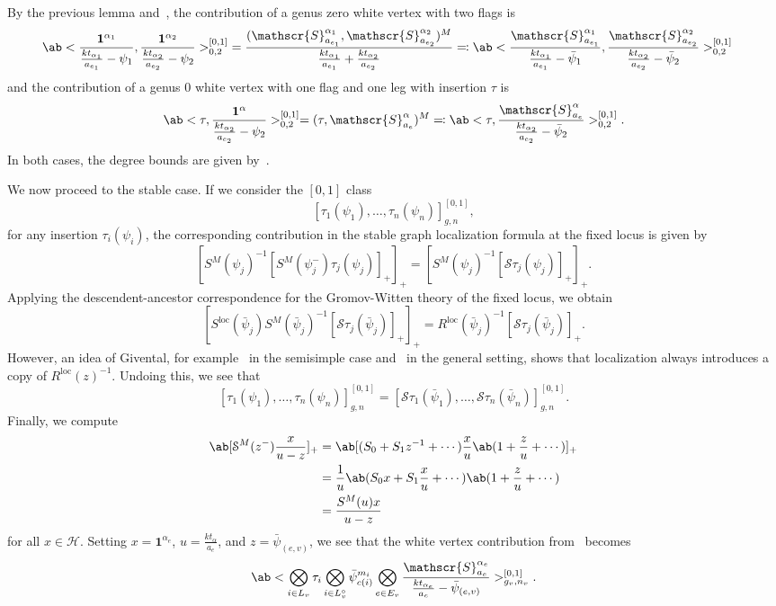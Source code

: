 \documentclass[10pt]{amsart}
\theoremstyle{definition}
\theoremstyle{remark}
\theoremstyle{plain}
\theoremstyle{definition}
\theoremstyle{remark}
\newcommand{\mc}[1]{\mathcal{#1}}
\newcommand{\msc}[1]{\mathscr{#1}}
\newcommand{\mr}[1]{\mathrm{#1}}
\newcommand{\1}{\mathbf{1}}
\newcommand{\2}{\mathbf{2}}
\newcommand{\3}{\mathbf{3}}
\newcommand{\loc}{\mr{loc}}
\numberwithin{equation}{section}
\begin{document}
By the previous lemma and~, the contribution of a genus zero white vertex with two flags is
\begin{align*}
    \ab<\frac{\1^{\alpha_1}}{\frac{k t_{\alpha_1}}{a_{e_1}} - \psi_1}, \frac{\1^{\alpha_2}}{\frac{kt_{\alpha_2}}{a_{e_2}} - \psi_2}>_{0,2}^{[0,1]} &= \frac{(\msc{S}_{a_{e_1}}^{\alpha_1}, \msc{S}_{a_{e_2}}^{\alpha_2})^M}{\frac{kt_{\alpha_1}}{a_{e_1}} + \frac{kt_{\alpha_2}}{a_{e_2}}} \eqqcolon \ab<\frac{\msc{S}_{a_{e_1}}^{\alpha_1}}{\frac{k t_{\alpha_1}}{a_{e_1}} - \bar{\psi}_1}, \frac{\msc{S}_{a_{e_2}}^{\alpha_2}}{\frac{kt_{\alpha_2}}{a_{e_2}} - \bar{\psi}_2}>_{0,2}^{[0,1]}
\end{align*}
and the contribution of a genus $0$ white vertex with one flag and one leg with insertion $\tau$ is
\begin{align*}
    \ab<\tau, \frac{\1^{\alpha}}{\frac{kt_{\alpha_2}}{a_{e_2}} - \psi_2}>_{0,2}^{[0,1]} = (\tau, \msc{S}_{a_e}^{\alpha})^M \eqqcolon\ab<\tau, \frac{\msc{S}_{a_e}^{\alpha}}{\frac{kt_{\alpha_2}}{a_{e_2}} - \bar{\psi}_2}>_{0,2}^{[0,1]}.
\end{align*}
In both cases, the degree bounds are given by~.


We now proceed to the stable case. If we consider the $[0,1]$ class
\[ [\tau_1(\psi_1), \ldots, \tau_n(\psi_n)]_{g,n}^{[0,1]}, \]
for any insertion $\tau_i(\psi_i)$, the corresponding contribution in the stable graph localization formula at the fixed locus is given by
\[ [S^M(\psi_j)^{-1} [S^M(\psi_j^-) \tau_j(\psi_j)]_+]_+ = [S^M(\psi_j)^{-1}[\mc{S}\tau_j(\psi_j)]_+]_+. \]
Applying the descendent-ancestor correspondence for the Gromov-Witten theory of the fixed locus, we obtain
\[ [S^{\loc}(\bar{\psi}_j) S^M(\bar{\psi}_j)^{-1}[\mc{S}\tau_j(\bar{\psi}_j)]_+]_+ = R^{\loc}(\bar{\psi}_j)^{-1} [\mc{S}\tau_j(\bar{\psi}_j)]_+. \]
However, an idea of Givental, for example~\cite[Theorem 9.1]{virasorofanotoric} in the semisimple case and~\cite[Theorem 3.5]{virasorotoricbundle} in the general setting, shows that localization always introduces a copy of $R^{\loc}(z)^{-1}$. Undoing this, we see that
\[ [\tau_1(\psi_1), \ldots, \tau_n(\psi_n)]_{g,n}^{[0,1]} = [\mc{S}\tau_1(\bar{\psi}_1), \ldots, \mc{S}\tau_n(\bar{\psi}_n)]_{g,n}^{[0,1]}. \]
Finally, we compute
\begin{align*}
    \ab[\mc{S}^M(z^-) \frac{x}{u-z}]_+ &= \ab[(S_0 + S_1 z^{-1} + \cdots)\frac{x}{u}\ab(1 + \frac{z}{u} + \cdots)]_+ \\
    &= \frac{1}{u} \ab(S_0x + S_1 \frac{x}{u} + \cdots) \ab(1 + \frac{z}{u} + \cdots) \\
    &= \frac{S^M(u) x}{u-z}
\end{align*}
for all $x \in \mc{H}$. Setting $x = \1^{\alpha_e}$, $u = \frac{kt_{\alpha}}{a_e}$, and $z = \bar{\psi}_{( e,v )}$, we see that the white vertex contribution from~ becomes
\[ \ab<\bigotimes_{i \in L_v} \tau_i \bigotimes_{i \in L_v^{\circ}} \bar{\psi}_{c(i)}^{m_i} \bigotimes_{e \in E_v} \frac{\msc{S}_{a_e}^{\alpha_e}}{\frac{k t_{\alpha_e}}{a_e} - \bar{\psi}_{ (e,v) }}>_{g_v, n_v}^{[0,1]}. \]
\end{document}
